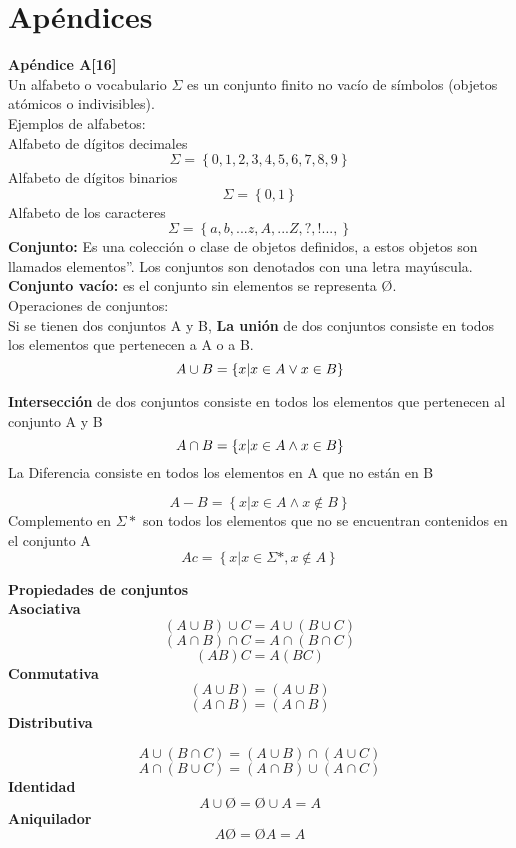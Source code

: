 \documentclass{llncs}
\begin{document}
\section{Apéndices}
\textbf{Apéndice  A[16]} \\
Un alfabeto o vocabulario $\Sigma  $ es un conjunto finito no vacío de símbolos (objetos atómicos o indivisibles).\\
 Ejemplos de alfabetos:\\
Alfabeto de dígitos decimales
\[
\Sigma=
\left\lbrace
0,1,2,3,4,5,6,7,8,9
\right\rbrace
\]
Alfabeto de dígitos binarios
\[
\Sigma=
\left\lbrace
0,1
\right\rbrace
\]
Alfabeto de los caracteres 
\[
\Sigma=
\left\lbrace
a, b,...z, A,...Z, ?,!..., 
\right\rbrace
\]
\textbf{Conjunto:} Es una colección o clase de objetos definidos, a estos objetos son llamados elementos”. Los conjuntos son denotados con una letra mayúscula.\\
\textbf{Conjunto vacío:} es el conjunto sin elementos se representa Ø.\\
Operaciones de conjuntos:\\
Si se tienen dos conjuntos A y B, \textbf{La unión} de dos conjuntos consiste en todos los elementos que pertenecen a A o a B.
\[
A \cup B =
\left\lbrace
 x | x \in A \bigskip    \vee  x \in B 
\right\rbrace
\]

 \textbf{Intersección} de dos conjuntos  consiste en todos los elementos que pertenecen al conjunto A y B
\[
A \cap B =
\left\lbrace
 x | x \in A \bigskip  \wedge    x \in B 
\right\rbrace
\]
La Diferencia consiste en todos los elementos en A que no están en B

\[
A-B  =
\left\lbrace
 x | x \in A   \wedge  x \not\in B 
\right\rbrace
\]
 Complemento en $\Sigma * $ son todos los elementos que no se encuentran contenidos en el conjunto A
\[
Ac  =
\left\lbrace
 x | x \in \Sigma*, x \not\in A
\right\rbrace
\]

\textbf{Propiedades de conjuntos}\\
\textbf{Asociativa}
 \[
 (A \cup B) \cup C = A \cup(B \cup C)  
  \]
\[
 (A \cap B) \cap C = A \cap(B \cap C)  
  \]
\[
 (AB)C = A(BC)  
  \]
  \textbf{Conmutativa}
 \[
 (A \cup B) = (A \cup B)  
  \]
   \[
 (A \cap B) = (A \cap B)  
  \]
 \textbf{Distributiva}

 \[
 A \cup (B \cap C) = (A \cup B) \cap (A \cup C)  
  \]
   \[
A \cap (B \cup C) = (A \cap B) \cup (A \cap C)
  \] 
 \textbf{Identidad}
 \[
 A \cup Ø = Ø \cup A = A
  \]
 \textbf{Aniquilador}
 \[
 A  Ø = Ø  A = A
  \]
\end{document}
